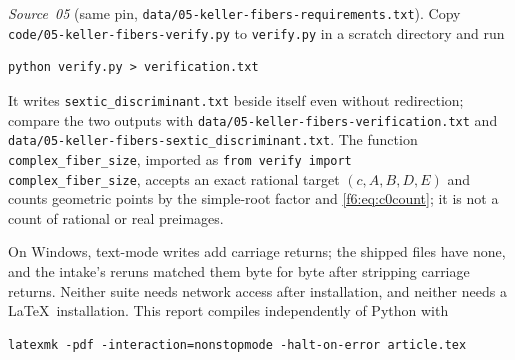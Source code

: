 \documentclass[11pt,a4paper]{article}
\theoremstyle{definition}
\newcommand{\code}[1]{\texttt{\nolinkurl{#1}}}
\begin{document}
\emph{Source~05} (same pin, \code{data/05-keller-fibers-requirements.txt}).
Copy \code{code/05-keller-fibers-verify.py} to \code{verify.py} in a scratch
directory and run
\begin{lstlisting}
python verify.py > verification.txt
\end{lstlisting}
It writes \code{sextic_discriminant.txt} beside itself even without
redirection; compare the two outputs with
\code{data/05-keller-fibers-verification.txt} and
\code{data/05-keller-fibers-sextic_discriminant.txt}. The function
\code{complex_fiber_size}, imported as \code{from verify import
complex_fiber_size}, accepts an exact rational target $(c,A,B,D,E)$ and
counts geometric points by the simple-root factor and
\eqref{f6:eq:c0count}; it is not a count of rational or real preimages.

On Windows, text-mode writes add carriage returns; the shipped files have
none, and the intake's reruns matched them byte for byte after stripping
carriage returns. Neither suite needs network access after installation, and
neither needs a \LaTeX\ installation. This report compiles independently of
Python with
\begin{lstlisting}
latexmk -pdf -interaction=nonstopmode -halt-on-error article.tex
\end{lstlisting}
\end{document}
